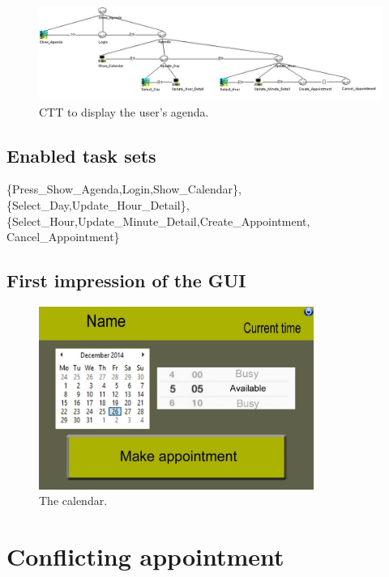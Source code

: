 \documentclass[11pt, a4paper,svglistings]{report}
\begin{document}
\begin{figure}[H]
\centering
    \includegraphics[width=1\textwidth]{ShowAgenda.jpg}
  \caption[Display agenda CTT]{\label{fig:ShowAgenda}CTT to display the user's agenda.}
\end{figure}

\subsection{Enabled task sets}

\{Press\_Show\_Agenda,Login,Show\_Calendar\},\{Select\_Day,Update\_Hour\_Detail\}, \\ \{Select\_Hour,Update\_Minute\_Detail,Create\_Appointment, Cancel\_Appointment\}


\subsection{First impression of the GUI}

\begin{figure}[H]
\centering
    \includegraphics[width=0.8\textwidth]{Calendar.jpg}
  \caption[The calendar]{\label{fig:ShowAgenda}The calendar.}
\end{figure}




\section{Conflicting appointment}
\end{document}
